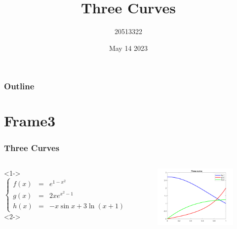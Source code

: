 \documentclass[mathserif]{beamer}
\title{Three Curves}
\author{20513322}
\date{May 14 2023}
\begin{document}
\begin{frame}
\maketitle
\end{frame}
\begin{frame}
\frametitle{Outline}
\tableofcontents
\end{frame}
\section{Frame3}
\begin{frame}\label{3}
\frametitle{Three Curves}
\begin{columns}
<1->
$$
\left\{
\begin{array}{lll}
f(x)&=&e^{1-x^2}\\
g(x)&=&2xe^{x^2-1}\\
h(x)&=&-x\sin x+3\ln(x+1)
\end{array}
\right.
$$
<2->
\begin{figure}
\centering
\includegraphics[scale=0.3]{Q2a}
\end{figure}
\end{columns}
\end{frame}
\end{document}
